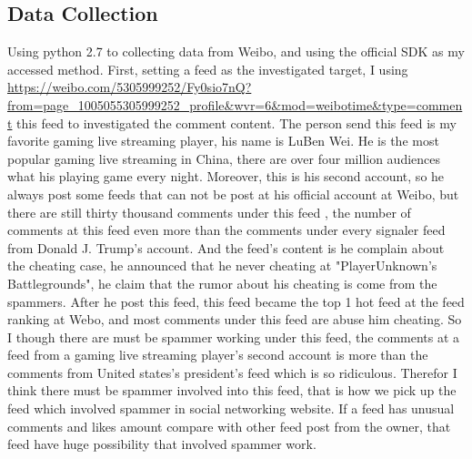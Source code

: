 \documentclass[sigconf]{acmart}
\begin{document}
\subsection{Data Collection}
Using python 2.7 to collecting data from Weibo, and using the official SDK as my accessed method. First, setting a feed as the investigated target, I using \url{https://weibo.com/5305999252/Fy0sio7nQ?
from=page\_1005055305999252\_profile&wvr=6&mod=weibotime&type=comment} this feed to investigated the comment content. The person send this feed is my favorite gaming live streaming player, his name is LuBen Wei. He is the most popular gaming live streaming in China, there are over four million audiences what his playing game every night. Moreover, this is his second account, so he always post some feeds that can not be post at his official account at Weibo, but there are still thirty thousand comments under this feed , the number of comments at this feed even more than the comments under every signaler feed from Donald J. Trump's account. And the feed's content is he complain about the cheating case, he announced that he never cheating at "PlayerUnknown's Battlegrounds", he claim that the rumor about his cheating is come from the spammers. After he post this feed, this feed became the top 1 hot feed at the feed ranking at Webo, and most comments under this feed are abuse him cheating. So I though there are must be spammer working under this feed, the comments at a feed from a gaming live streaming player's second account is more than the comments from United states's president's feed which is so ridiculous. Therefor I think there must be spammer involved into this feed, that is how we pick up the feed which involved spammer  in social networking website. If a feed has unusual comments and likes amount compare with other feed post from the owner, that feed have huge possibility that involved spammer work. 
\end{document}

